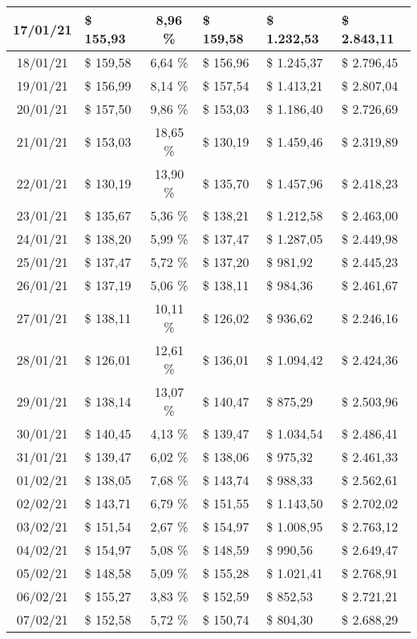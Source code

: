 \begin{center}
\begin{small}
\begin{longtable}{|c|l|c|l|l|l|}
17/01/21 & \$ 155,93 & 8,96 \% & \$ 159,58 & \$ 1.232,53 & \$ 2.843,11 \\ \hline
18/01/21 & \$ 159,58 & 6,64 \% & \$ 156,96 & \$ 1.245,37 & \$ 2.796,45 \\ \hline
19/01/21 & \$ 156,99 & 8,14 \% & \$ 157,54 & \$ 1.413,21 & \$ 2.807,04 \\ \hline
20/01/21 & \$ 157,50 & 9,86 \% & \$ 153,03 & \$ 1.186,40 & \$ 2.726,69 \\ \hline
21/01/21 & \$ 153,03 & 18,65 \% & \$ 130,19 & \$ 1.459,46 & \$ 2.319,89 \\ \hline
22/01/21 & \$ 130,19 & 13,90 \% & \$ 135,70 & \$ 1.457,96 & \$ 2.418,23 \\ \hline
23/01/21 & \$ 135,67 & 5,36 \% & \$ 138,21 & \$ 1.212,58 & \$ 2.463,00 \\ \hline
24/01/21 & \$ 138,20 & 5,99 \% & \$ 137,47 & \$ 1.287,05 & \$ 2.449,98 \\ \hline
25/01/21 & \$ 137,47 & 5,72 \% & \$ 137,20 & \$ 981,92 & \$ 2.445,23 \\ \hline
26/01/21 & \$ 137,19 & 5,06 \% & \$ 138,11 & \$ 984,36 & \$ 2.461,67 \\ \hline
27/01/21 & \$ 138,11 & 10,11 \% & \$ 126,02 & \$ 936,62 & \$ 2.246,16 \\ \hline
28/01/21 & \$ 126,01 & 12,61 \% & \$ 136,01 & \$ 1.094,42 & \$ 2.424,36 \\ \hline
29/01/21 & \$ 138,14 & 13,07 \% & \$ 140,47 & \$ 875,29 & \$ 2.503,96 \\ \hline
30/01/21 & \$ 140,45 & 4,13 \% & \$ 139,47 & \$ 1.034,54 & \$ 2.486,41 \\ \hline
31/01/21 & \$ 139,47 & 6,02 \% & \$ 138,06 & \$ 975,32 & \$ 2.461,33 \\ \hline
01/02/21 & \$ 138,05 & 7,68 \% & \$ 143,74 & \$ 988,33 & \$ 2.562,61 \\ \hline
02/02/21 & \$ 143,71 & 6,79 \% & \$ 151,55 & \$ 1.143,50 & \$ 2.702,02 \\ \hline
03/02/21 & \$ 151,54 & 2,67 \% & \$ 154,97 & \$ 1.008,95 & \$ 2.763,12 \\ \hline
04/02/21 & \$ 154,97 & 5,08 \% & \$ 148,59 & \$ 990,56 & \$ 2.649,47 \\ \hline
05/02/21 & \$ 148,58 & 5,09 \% & \$ 155,28 & \$ 1.021,41 & \$ 2.768,91 \\ \hline
06/02/21 & \$ 155,27 & 3,83 \% & \$ 152,59 & \$ 852,53 & \$ 2.721,21 \\ \hline
07/02/21 & \$ 152,58 & 5,72 \% & \$ 150,74 & \$ 804,30 & \$ 2.688,29 \\ \hline

\end{longtable}
\end{small}
\end{center}
